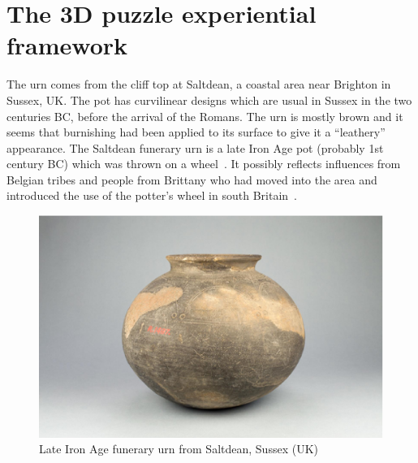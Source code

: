\documentclass[acmlarge,screen,dvipsnames]{acmart}
\begin{document}
\section{The 3D puzzle experiential framework}
\label{requirements}
 The urn comes
from the cliff top at Saltdean, a coastal area near Brighton in
Sussex, UK. The pot has curvilinear designs which are usual in Sussex
in the two centuries BC, before the arrival of the Romans. The urn is
mostly brown and it seems that burnishing had been applied to its
surface to give it a ``leathery'' appearance. The Saltdean funerary
urn is a late Iron Age pot (probably 1st century BC) which was thrown
on a wheel~\cite{Toms1912}. It possibly reflects influences from
Belgian tribes and people from Brittany who had moved into the area
and introduced the use of the potter's wheel in south
Britain~\cite{Harding1974,Cunliffe1978,Adkins1982,Cunliffe1995}.
%
\begin{figure}[H]
  \centering
  \includegraphics[width=0.6\linewidth]{images/pot}
  \caption{\label{fig:pot}
    Late Iron Age funerary urn from Saltdean, Sussex (UK)}
\end{figure}
\end{document}
